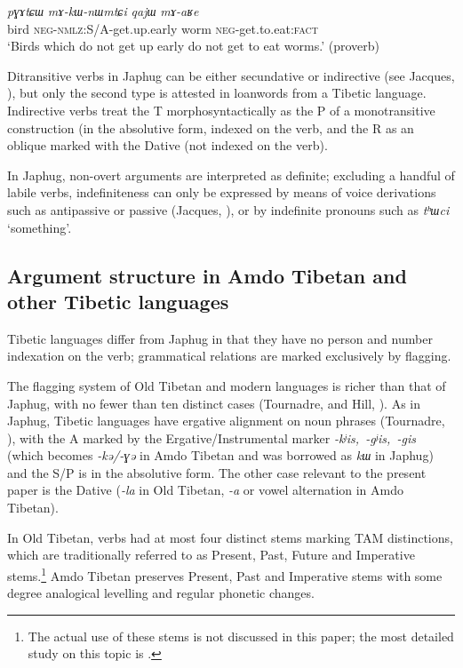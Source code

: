 \documentclass[oneside,a4paper,11pt]{article}
\newcommand{\ipa}[1]{{\phon\textit{\mbox{#1}}}} %
\begin{document}
\begin{exe}
\ex \label{ex:maRe}
\gll
\ipa{pɣɤtɕɯ}  	\ipa{mɤ-kɯ-nɯmtɕi}  	\ipa{qajɯ}  	\ipa{mɤ-aʁe}  \\
bird \textsc{neg-nmlz}:S/A-get.up.early worm \textsc{neg}-get.to.eat:\textsc{fact} \\
\glt `Birds which do not get up early do not get to eat worms.' (proverb) 
\end{exe}  

Ditransitive verbs in Japhug can be either secundative or indirective (see Jacques, \citeyear{jacques14antipassive}), but only the second type is attested in loanwords from a Tibetic language. Indirective verbs treat the T morphosyntactically as the P of a monotransitive construction (in the absolutive form, indexed on the verb, and the R as an oblique marked with the Dative (not indexed on the verb).

In Japhug, non-overt arguments are interpreted as definite; excluding a handful of labile verbs, indefiniteness can only be expressed by means of voice derivations such as antipassive or passive (Jacques, \citeyear{jacques12demotion}), or by indefinite pronouns such as \ipa{tʰɯci} `something'.

\subsection{Argument structure in Amdo Tibetan and other Tibetic languages}
Tibetic languages differ from Japhug in that they have no person and number indexation on the verb; grammatical relations are marked exclusively by flagging.

The flagging system of Old Tibetan and modern languages is richer than that of Japhug,  with no fewer than ten distinct cases (Tournadre, \citeyear{tournadre10cases} and  Hill, \citeyear{hill12bas}). As in Japhug, Tibetic languages have ergative alignment on noun phrases (Tournadre, \citeyear{tournadre96erg}), with the A marked by the Ergative/Instrumental marker \ipa{-kʲis, -gʲis, -gis} (which becomes \ipa{-kə/-ɣə} in Amdo Tibetan and was borrowed as \ipa{kɯ} in Japhug) and the S/P is in the absolutive form. The other case relevant to the present paper is the Dative (\ipa{-la} in Old Tibetan, \ipa{-a} or vowel alternation in Amdo Tibetan).


In Old Tibetan, verbs had at most four distinct stems marking TAM distinctions, which are traditionally referred to as Present, Past, Future and Imperative stems.\footnote{The actual use of these stems is not discussed in this paper; the most detailed study on this topic is \citet{zeisler04}.} Amdo Tibetan preserves Present, Past and Imperative stems with some degree analogical levelling and regular phonetic changes.
\end{document}
